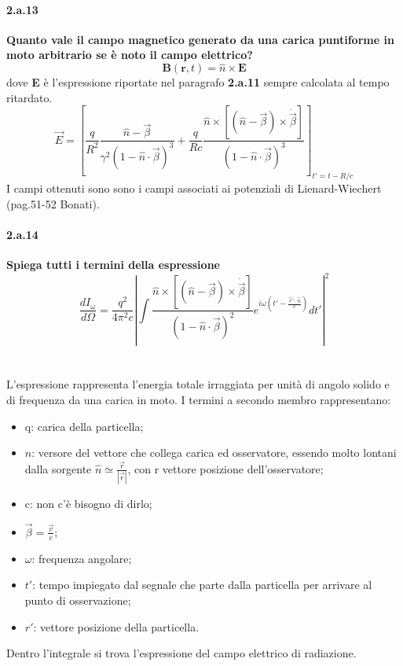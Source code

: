 \documentclass[twoside]{article}
\begin{document}
\paragraph{2.a.13}\textbf{Quanto vale il campo magnetico generato da una carica puntiforme in moto arbitrario se è noto il campo elettrico?}\\
\[
\textbf{B}(\textbf{r},t)=\hat{n} \times \textbf{E}
\] 
dove \textbf{E} è l'espressione riportate nel paragrafo \textbf{2.a.11} sempre calcolata al tempo ritardato.
\[
\vec{E}=\left[\frac{q}{R^2}\frac{\hat{n}-\vec{\beta}}{\gamma^2(1-\hat{n}\cdot \vec{\beta})^3}+ \frac{q}{R c}\frac{\hat{n}\times[(\hat{n}-\vec{\beta})\times \dot{\vec{\beta}}]}{(1-\hat{n}\cdot \vec{\beta})^3}\right]_{t'=t-R/c}
\]
I campi ottenuti sono sono i campi associati ai potenziali di Lienard-Wiechert (pag.51-52 Bonati).



\paragraph{2.a.14}\textbf{Spiega tutti i termini della espressione
\[
 \frac{dI_\omega}{d\Omega}=\frac{q^2}{4\pi^2c}\left|\int \frac{\hat{n}\times[(\hat{n}-\vec{\beta})\times \dot{\vec{\beta}}]}{(1-\hat{n}\cdot \vec{\beta})^2} e^{i\omega(t'-\frac{\vec{r}'\cdot\hat{n}}{c})} dt'\right|^2
\]
}\\
\\
L'espressione rappresenta l'energia totale irraggiata per unità di angolo solido e di frequenza da una carica in moto. I termini a secondo membro rappresentano:
\begin{itemize}
    \item q: carica della particella;
    \item $\hat{n}$: versore del vettore che collega carica ed osservatore, essendo molto lontani dalla sorgente $\hat{n}\simeq \frac{\vec{r}}{|\vec{r}|}$, con r vettore posizione dell'osservatore;
    \item c: non c'è bisogno di dirlo;
    \item $\vec{\beta}= \frac{\vec{v}}{c}$;
    \item $\omega$: frequenza angolare;
    \item $t'$:  tempo impiegato dal segnale che parte dalla particella per arrivare al punto di osservazione;
    \item $r'$: vettore posizione della particella.
\end{itemize}
Dentro l'integrale si trova l'espressione del campo elettrico di radiazione.
\end{document}
